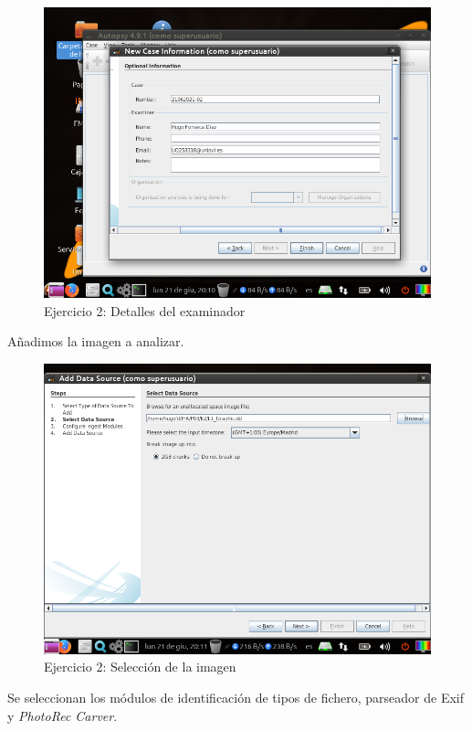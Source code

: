 \documentclass[11pt]{article}
\begin{document}
\begin{figure}[H]
    \caption{Ejercicio 2: Detalles del examinador}
    \centering
    \includegraphics[scale=0.7]{e2-2.png}
\end{figure}

Añadimos la imagen a analizar.

\begin{figure}[H]
    \caption{Ejercicio 2: Selección de la imagen}
    \centering
    \includegraphics[scale=0.7]{e2-3.png}
\end{figure}

Se seleccionan los módulos de identificación de tipos de fichero, parseador de Exif y \textit{PhotoRec Carver}.
\end{document}
